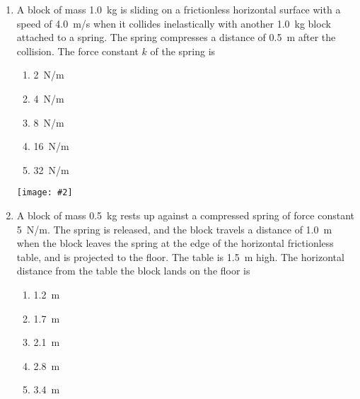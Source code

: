 \documentclass[12pt]{article}
\newcommand{\pic}[2]{\texttt{[image: \#2]}}
\begin{document}
\begin{enumerate}[leftmargin=50pt,label=\underline{\hspace{0.4in}} \arabic*.]
  \begin{center}
  \end{center}
  
\item\vspace{-0.2in} A block of mass \SI{1.0}{\kg} is sliding on a frictionless horizontal
  surface with a speed of \SI{4.0}{m/s} when it collides inelastically with
  another \SI{1.0}{kg} block attached to a spring. The spring compresses a
  distance of \SI{0.5}{m} after the collision. The force constant $k$ of the
  spring is
  \begin{enumerate}[noitemsep,topsep=0pt]
  \item\SI{2}{N/m}
  \item\SI{4}{N/m}
  \item\SI{8}{N/m}
  \item\SI{16}{N/m}
  \item\SI{32}{N/m}
  \end{enumerate}

  \begin{center}
    \pic{0.5}{projectile.png}
  \end{center}
  
\item A block of mass \SI{0.5}{kg} rests up against a compressed spring of force
  constant \SI{5}{N/m}. The spring is released, and the block travels a distance
  of \SI{1.0}{m} when the block leaves the spring at the edge of the horizontal
  frictionless table, and is projected to the floor. The table is \SI{1.5}{m}
  high. The horizontal distance from the table the block lands on the floor is
  \begin{enumerate}[noitemsep,topsep=0pt]
  \item\SI{1.2}{\metre}
  \item\SI{1.7}{\metre}
  \item\SI{2.1}{\metre}
  \item\SI{2.8}{\metre}
  \item\SI{3.4}{\metre}
  \end{enumerate}
\end{enumerate}
\end{document}
